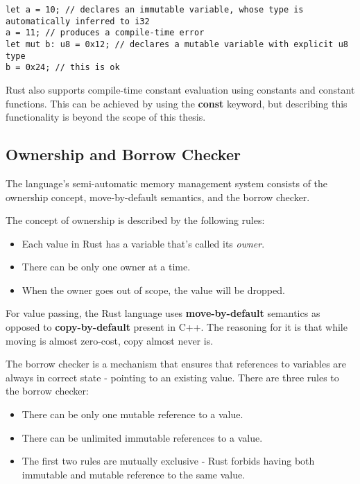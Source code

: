 \begin{lstlisting}[caption={An example of declaring variables and their mutability in Rust.},label=lst:mut]
let a = 10; // declares an immutable variable, whose type is automatically inferred to i32
a = 11; // produces a compile-time error
let mut b: u8 = 0x12; // declares a mutable variable with explicit u8 type
b = 0x24; // this is ok
\end{lstlisting}

Rust also supports compile-time constant evaluation using constants and constant functions.
This can be achieved by using the \textbf{const} keyword, but describing this functionality is beyond the scope of this thesis.

\subsection{Ownership and Borrow Checker}
\label{subsec:borrow}
The language's semi-automatic memory management system consists of the ownership concept, move-by-default semantics, and the borrow checker.

The concept of ownership is described by the following rules\cite{klabnik_rust_nodate}:
\begin{itemize}
    \item Each value in Rust has a variable that's called its \textit{owner}.
    \item There can be only one owner at a time.
    \item When the owner goes out of scope, the value will be dropped.
\end{itemize}
For value passing, the Rust language uses \textbf{move-by-default} semantics as opposed to \textbf{copy-by-default} present in C++.
The reasoning for it is that while moving is almost zero-cost, copy almost never is.

The borrow checker is a mechanism that ensures that references to variables are always in correct state - pointing to an existing value.
There are three rules to the borrow checker:
\begin{itemize}
    \item There can be only one mutable reference to a value.
    \item There can be unlimited immutable references to a value.
    \item The first two rules are mutually exclusive - Rust forbids having both immutable and mutable reference to the same value.
\end{itemize}

